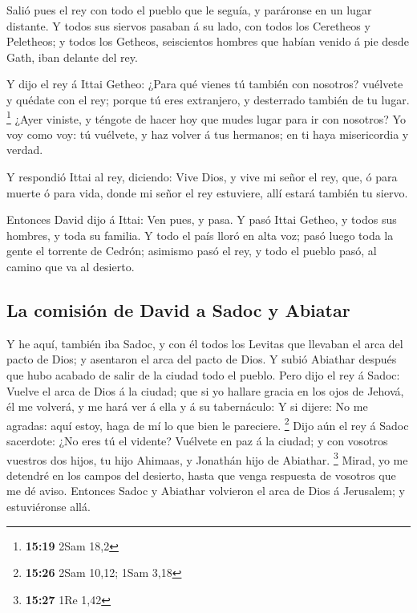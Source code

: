  Salió pues el rey con todo el pueblo que le seguía, y
paráronse en un lugar distante.  Y todos sus siervos
pasaban á su lado, con todos los Ceretheos y Peletheos; y todos los
Getheos, seiscientos hombres que habían venido á pie desde Gath, iban
delante del rey.

 Y dijo el rey á Ittai Getheo: ¿Para qué vienes tú
también con nosotros? vuélvete y quédate con el rey; porque tú eres
extranjero, y desterrado también de tu lugar. \footnote{\textbf{15:19}
  2Sam 18,2}  ¿Ayer viniste, y téngote de hacer hoy que
mudes lugar para ir con nosotros? Yo voy como voy: tú vuélvete, y haz
volver á tus hermanos; en ti haya misericordia y verdad.

 Y respondió Ittai al rey, diciendo: Vive Dios, y vive mi
señor el rey, que, ó para muerte ó para vida, donde mi señor el rey
estuviere, allí estará también tu siervo.

 Entonces David dijo á Ittai: Ven pues, y pasa. Y pasó
Ittai Getheo, y todos sus hombres, y toda su familia.  Y
todo el país lloró en alta voz; pasó luego toda la gente el torrente de
Cedrón; asimismo pasó el rey, y todo el pueblo pasó, al camino que va al
desierto.

\hypertarget{la-comisiuxf3n-de-david-a-sadoc-y-abiatar}{%
\subsection{La comisión de David a Sadoc y
Abiatar}\label{la-comisiuxf3n-de-david-a-sadoc-y-abiatar}}

 Y he aquí, también iba Sadoc, y con él todos los Levitas
que llevaban el arca del pacto de Dios; y asentaron el arca del pacto de
Dios. Y subió Abiathar después que hubo acabado de salir de la ciudad
todo el pueblo.  Pero dijo el rey á Sadoc: Vuelve el arca
de Dios á la ciudad; que si yo hallare gracia en los ojos de Jehová, él
me volverá, y me hará ver á ella y á su tabernáculo:  Y
si dijere: No me agradas: aquí estoy, haga de mí lo que bien le
pareciere. \footnote{\textbf{15:26} 2Sam 10,12; 1Sam 3,18}
 Dijo aún el rey á Sadoc sacerdote: ¿No eres tú el
vidente? Vuélvete en paz á la ciudad; y con vosotros vuestros dos hijos,
tu hijo Ahimaas, y Jonathán hijo de Abiathar. \footnote{\textbf{15:27}
  1Re 1,42}  Mirad, yo me detendré en los campos del
desierto, hasta que venga respuesta de vosotros que me dé aviso.
 Entonces Sadoc y Abiathar volvieron el arca de Dios á
Jerusalem; y estuviéronse allá.

